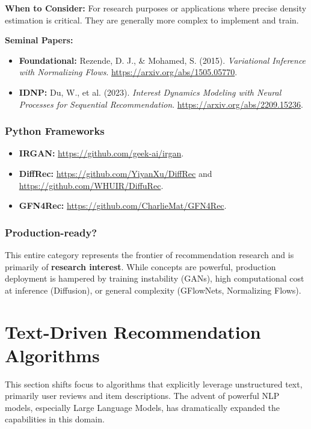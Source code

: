 \documentclass{article}
\begin{document}
\noindent\textbf{When to Consider:} For research purposes or applications where precise density estimation is critical. They are generally more complex to implement and train.

\noindent\textbf{Seminal Papers:}
    \begin{itemize}
        \item \textbf{Foundational:} Rezende, D. J., \& Mohamed, S. (2015). \textit{Variational Inference with Normalizing Flows}. \url{https://arxiv.org/abs/1505.05770}.
        \item \textbf{IDNP:} Du, W., et al. (2023). \textit{Interest Dynamics Modeling with Neural Processes for Sequential Recommendation}. \url{https://arxiv.org/abs/2209.15236}.
    \end{itemize}
    
    \subsubsection*{Python Frameworks}
    \begin{itemize}
        \item \textbf{IRGAN:} \url{https://github.com/geek-ai/irgan}.
        \item \textbf{DiffRec:} \url{https://github.com/YiyanXu/DiffRec} and \url{https://github.com/WHUIR/DiffuRec}.
        \item \textbf{GFN4Rec:} \url{https://github.com/CharlieMat/GFN4Rec}.
    \end{itemize}
    
    \subsubsection*{Production-ready?}
    This entire category represents the frontier of recommendation research and is primarily of \textbf{research interest}. While concepts are powerful, production deployment is hampered by training instability (GANs), high computational cost at inference (Diffusion), or general complexity (GFlowNets, Normalizing Flows).

    \section{Text-Driven Recommendation Algorithms}
    This section shifts focus to algorithms that explicitly leverage unstructured text, primarily user reviews and item descriptions. The advent of powerful NLP models, especially Large Language Models, has dramatically expanded the capabilities in this domain.
    
\end{document}
